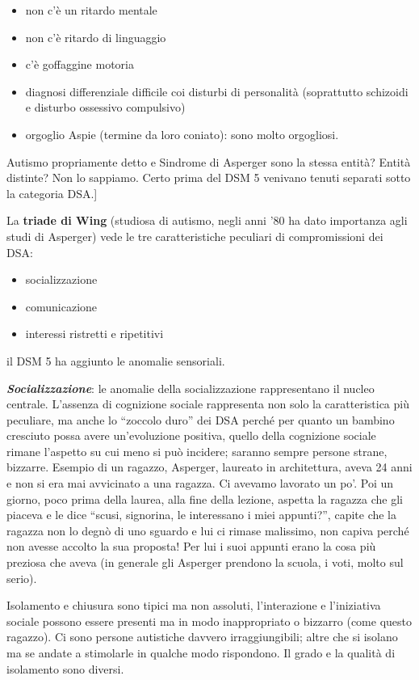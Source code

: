 \documentclass[]{article}
\begin{document}
\begin{itemize}
\item
  non c'è un ritardo mentale
\item
  non c'è ritardo di linguaggio
\item
  c'è goffaggine motoria
\item
  diagnosi differenziale difficile coi disturbi di personalità
  (soprattutto schizoidi e disturbo ossessivo compulsivo)
\item
  orgoglio Aspie (termine da loro coniato): sono molto orgogliosi.
\end{itemize}

Autismo propriamente detto e Sindrome di Asperger sono la stessa entità?
Entità distinte? Non lo sappiamo. Certo prima del DSM 5 venivano tenuti
separati sotto la categoria DSA.{]}

La \textbf{triade di Wing} (studiosa di autismo, negli anni '80 ha dato
importanza agli studi di Asperger) vede le tre caratteristiche peculiari
di compromissioni dei DSA:

\begin{itemize}
\item
  socializzazione
\item
  comunicazione
\item
  interessi ristretti e ripetitivi
\end{itemize}

il DSM 5 ha aggiunto le anomalie sensoriali.

\emph{\textbf{Socializzazione}}: le anomalie della socializzazione
rappresentano il nucleo centrale. L'assenza di cognizione sociale
rappresenta non solo la caratteristica più peculiare, ma anche lo
``zoccolo duro'' dei DSA perché per quanto un bambino cresciuto possa
avere un'evoluzione positiva, quello della cognizione sociale rimane
l'aspetto su cui meno si può incidere; saranno sempre persone strane,
bizzarre. Esempio di un ragazzo, Asperger, laureato in architettura,
aveva 24 anni e non si era mai avvicinato a una ragazza. Ci avevamo
lavorato un po'. Poi un giorno, poco prima della laurea, alla fine della
lezione, aspetta la ragazza che gli piaceva e le dice ``scusi,
signorina, le interessano i miei appunti?'', capite che la ragazza non
lo degnò di uno sguardo e lui ci rimase malissimo, non capiva perché non
avesse accolto la sua proposta! Per lui i suoi appunti erano la cosa più
preziosa che aveva (in generale gli Asperger prendono la scuola, i voti,
molto sul serio).

Isolamento e chiusura sono tipici ma non assoluti, l'interazione e
l'iniziativa sociale possono essere presenti ma in modo inappropriato o
bizzarro (come questo ragazzo). Ci sono persone autistiche davvero
irraggiungibili; altre che si isolano ma se andate a stimolarle in
qualche modo rispondono. Il grado e la qualità di isolamento sono
diversi.
\end{document}
